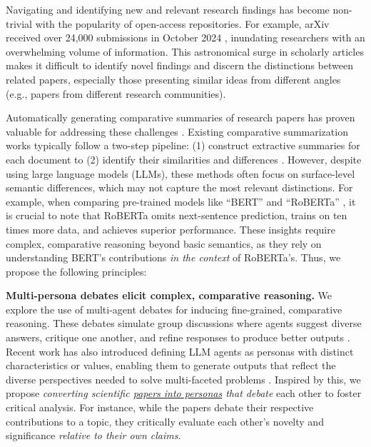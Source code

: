 \par Navigating and identifying new and relevant research findings has become non-trivial with the popularity of open-access repositories. For example, arXiv received over 24,000 submissions in October 2024 \cite{arxiv_monthly_submissions}, inundating researchers with an overwhelming volume of information. This astronomical surge in scholarly articles makes it difficult to identify novel findings and discern the distinctions between related papers, especially those presenting similar ideas from different angles (e.g., papers from different research communities).

\par Automatically generating comparative summaries of research papers has proven valuable for addressing these challenges \cite{whats_new}. Existing comparative summarization works \cite{Strhle2023} typically follow a two-step pipeline: (1) construct extractive summaries for each document to (2) identify their similarities and differences \cite{lerman2009contrastive,gunel2024strum}. However, despite using large language models (LLMs), these methods often focus on surface-level semantic differences, which may not capture the most relevant distinctions. For example, when comparing pre-trained models like ``BERT'' \cite{devlin-etal-2019-bert} and ``RoBERTa'' \cite{Liu2019RoBERTaAR}, it is crucial to note that RoBERTa omits next-sentence prediction, trains on ten times more data, and achieves superior performance. These insights require complex, comparative reasoning beyond basic semantics, as they rely on understanding BERT's contributions \textit{in the context} of RoBERTa's. Thus, we propose the following principles:

\par{\textbf{Multi-persona debates elicit complex, comparative reasoning.}} We explore the use of multi-agent debates for inducing fine-grained, comparative reasoning. These debates simulate group discussions where agents suggest diverse answers, critique one another, and refine responses to produce better outputs \cite{chan2023chateval, liang2023encouraging}. Recent work has also introduced defining LLM agents as personas with distinct characteristics or values, enabling them to generate outputs that reflect the diverse perspectives needed to solve multi-faceted problems \cite{tseng2024two,wang-etal-2024-unleashing}. Inspired by this, we propose \textit{converting scientific \underline{papers into personas} that debate} each other to foster critical analysis. For instance, while the papers debate their respective contributions to a topic, they critically evaluate each other's novelty and significance \textit{relative to their own claims}.

